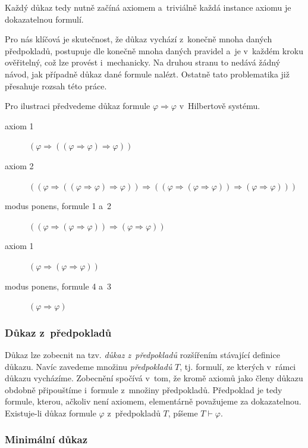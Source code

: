 \documentclass[thesis=B,czech,hidelinks]{thesis}[2012/06/26]
\begin{document}
Každý důkaz tedy nutně začíná axiomem a~triviálně každá instance axiomu je dokazatelnou formulí.

Pro nás klíčová je skutečnost, že důkaz vychází z~konečně mnoha daných předpokladů, postupuje dle konečně mnoha daných pravidel a~je v~každém kroku ověřitelný, což lze provést i~mechanicky. Na druhou stranu to nedává žádný návod, jak případně důkaz dané formule nalézt. Ostatně tato problematika již přesahuje rozsah této práce.

\begin{exm}
\label{exm:proof_a>a}
Pro ilustraci předvedeme důkaz formule $\varphi \Rightarrow \varphi$ v~Hilbertově systému.
\begin{description}
	\item[axiom 1] $(\varphi \Rightarrow ((\varphi \Rightarrow \varphi) \Rightarrow \varphi))$
	\item[axiom 2] $((\varphi \Rightarrow ((\varphi \Rightarrow \varphi) \Rightarrow \varphi)) \Rightarrow ((\varphi \Rightarrow (\varphi \Rightarrow \varphi)) \Rightarrow (\varphi \Rightarrow \varphi)))$
	\item[modus ponens, formule 1 a~2] $((\varphi \Rightarrow (\varphi \Rightarrow \varphi)) \Rightarrow (\varphi \Rightarrow \varphi))$
	\item[axiom 1] $(\varphi \Rightarrow (\varphi \Rightarrow \varphi))$
	\item[modus ponens, formule 4 a~3] $(\varphi \Rightarrow \varphi)$
\end{description}
\end{exm}

\subsubsection{Důkaz z~předpokladů}

Důkaz lze zobecnit na tzv. \emph{důkaz z~předpokladů} rozšířením stávající definice důkazu. Navíc zavedeme množinu \emph{předpokladů} $T$, tj. formulí, ze kterých v~rámci důkazu vycházíme. Zobecnění spočívá v~tom, že kromě axiomů jako členy důkazu obdobně připouštíme i~formule z~množiny předpokladů. Předpoklad je tedy formule, kterou, ačkoliv není axiomem, elementárně považujeme za dokazatelnou. Existuje-li důkaz formule $\varphi$ z~předpokladů $T$, píšeme $T \vdash \varphi$.

\subsubsection{Minimální důkaz}
\end{document}
